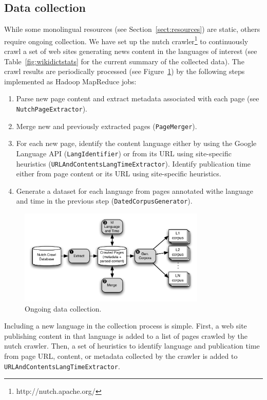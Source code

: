 \documentclass{article}
\newcommand{\secref}[1]{Section~\ref{#1}}
\newcommand{\tabref}[1]{Table~\ref{#1}}
\newcommand{\figref}[1]{Figure~\ref{#1}}
\begin{document}
\subsection{Data collection} \label{sect:datacollect}

While some monolingual resources (see \secref{sect:resources}) are static, others require ongoing collection.  We have set up the nutch crawler\footnote{http://nutch.apache.org/} to continuously crawl a set of web sites generating news content in the languages of interest (see \tabref{fig:wikidictstats} for the current summary of the collected data).  The crawl results are periodically processed (see \figref{fig:data}) by the following steps implemented as Hadoop MapReduce jobs:

\begin{enumerate}
 \item Parse new page content and extract metadata associated with each page (see \small{\tt NutchPageExtractor}).
 \item Merge new and previously extracted pages (\small{\tt PageMerger}).
 \item For each new page, identify the content language either by using the Google Language API (\small{\tt LangIdentifier}) or from its URL using site-specific heuristics (\small{\tt URLAndContentsLangTimeExtractor}).  Identify publication time either from page content or its URL using site-specific heuristics.
 \item Generate a dataset for each language from pages annotated withe language and time in the previous step (\small{\tt DatedCorpusGenerator}).  
\end{enumerate}

\begin{figure}[h]
\centerline{\mbox{\includegraphics[width=3.5in]{figures/datacollect}}}
\caption{Ongoing data collection.}
\label{fig:data}
\end{figure}

Including a new language in the collection process is simple.  First, a web site publishing content in that language is added to a list of pages crawled by the nutch crawler.  Then, a set of heuristics to identify language and publication time from page URL, content, or metadata collected by the crawler is added to \small{\tt URLAndContentsLangTimeExtractor}.
\end{document}
